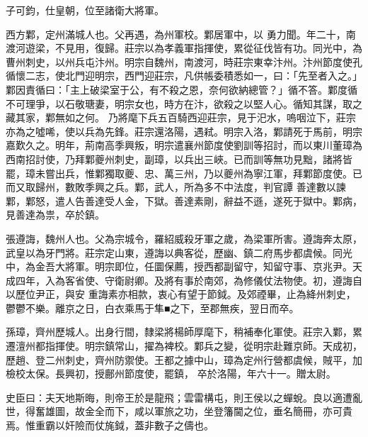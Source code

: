 \begin{pinyinscope}
 子可鈞，仕皇朝，位至諸衛大將軍。



 西方鄴，定州滿城人也。父再遇，為州軍校。鄴居軍中，以
 勇力聞。年二十，南渡河遊梁，不見用，復歸。莊宗以為孝義軍指揮使，累從征伐皆有功。同光中，為曹州刺史，以州兵屯汴州。明宗自魏州，南渡河，時莊宗東幸汴州。汴州節度使孔循懷二志，使北門迎明宗，西門迎莊宗，凡供帳委積悉如一，曰：「先至者入之。」鄴因責循曰：「主上破梁室于公，有不殺之恩，奈何欲納總管？」循不答。鄴度循不可理爭，以石敬瑭妻，明宗女也，時方在汴，欲殺之以堅人心。循知其謀，取之藏其家，鄴無如之何。
 乃將麾下兵五百騎西迎莊宗，見于汜水，嗚咽泣下，莊宗亦為之噓唏，使以兵為先鋒。莊宗還洛陽，遇弒。明宗入洛，鄴請死于馬前，明宗嘉歎久之。明年，荊南高季興叛，明宗遣襄州節度使劉訓等招討，而以東川董璋為西南招討使，乃拜鄴夔州刺史，副璋，以兵出三峽。已而訓等無功見黜，諸將皆罷，璋未嘗出兵，惟鄴獨取夔、忠、萬三州，乃以夔州為寧江軍，拜鄴節度使。已而又取歸州，數敗季興之兵。鄴，武人，所為多不中法度，判官譚
 善達數以諫鄴，鄴怒，遣人告善達受人金，下獄。善達素剛，辭益不遜，遂死于獄中。鄴病，見善達為祟，卒於鎮。



 張遵誨，魏州人也。父為宗城令，羅紹威殺牙軍之歲，為梁軍所害。遵誨奔太原，武皇以為牙門將。莊宗定山東，遵誨以典客從，歷幽、鎮二府馬步都虞候。同光中，為金吾大將軍。明宗即位，任圜保薦，授西都副留守，知留守事、京兆尹。天成四年，入為客省使、守衛尉卿。及將有事於南郊，為修儀仗法物使。初，遵誨自以歷位尹正，與安
 重誨素亦相款，衷心有望于節鉞。及郊禋畢，止為絳州刺史，鬱鬱不樂。離京之日，白衣乘馬于隼■之下，至郡無疾，翌日而卒。



 孫璋，齊州歷城人。出身行間，隸梁將楊師厚麾下，稍補奉化軍使。莊宗入鄴，累遷澶州都指揮使。明宗鎮常山，擢為裨校。鄴兵之變，從明宗赴難京師。天成初，歷趙、登二州刺史，齊州防禦使。王都之據中山，璋為定州行營都虞候，賊平，加檢校太保。長興初，授鄜州節度使，罷鎮，
 卒於洛陽，年六十一。贈太尉。



 史臣曰：夫天地斯晦，則帝王於是龍飛；雲雷構屯，則王侯以之蟬蛻。良以適遭亂世，得奮雄圖，故金全而下，咸以軍旅之功，坐登籓閫之位，垂名簡冊，亦可貴焉。惟重霸以奸險而仗旄鉞，蓋非數子之儔也。



\end{pinyinscope}